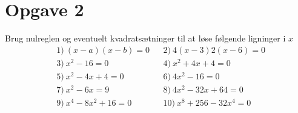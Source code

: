 \section*{Opgave 2}
Brug nulreglen og eventuelt kvadratsætninger til at løse følgende ligninger i $x$
\begin{align*}
&1) \ (x-a)(x-b) = 0  &&2) \ 4(x-3)2(x-6) = 0   \\
&3) \ x^2-16 = 0   &&4) \ x^2+4x+4 =0  \\
&5) \ x^2-4x+4 = 0   &&6) \ 4x^2-16 = 0   \\
&7) \ x^2-6x = 9  &&8) \ 4x^2-32x+64=0   \\
&9) \ x^4-8x^2+16 =0 &&10) \ x^8+256-32x^4=0   \\
\end{align*}